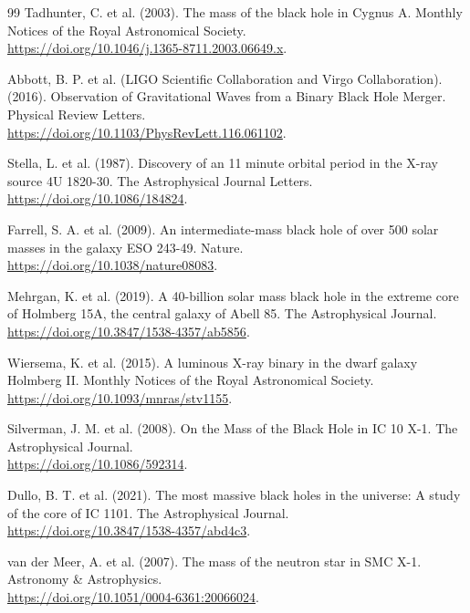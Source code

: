 \documentclass[11pt, a4paper]{article}
\begin{document}
\begin{thebibliography}{99}
  Tadhunter, C. et al. (2003). The mass of the black hole in Cygnus A. Monthly Notices of the Royal Astronomical Society. \\ \url{https://doi.org/10.1046/j.1365-8711.2003.06649.x}.

  Abbott, B. P. et al. (LIGO Scientific Collaboration and Virgo Collaboration). (2016). Observation of Gravitational Waves from a Binary Black Hole Merger. Physical Review Letters. \\ \url{https://doi.org/10.1103/PhysRevLett.116.061102}.

  Stella, L. et al. (1987). Discovery of an 11 minute orbital period in the X-ray source 4U 1820-30. The Astrophysical Journal Letters. \\ \url{https://doi.org/10.1086/184824}.

  Farrell, S. A. et al. (2009). An intermediate-mass black hole of over 500 solar masses in the galaxy ESO 243-49. Nature. \\ \url{https://doi.org/10.1038/nature08083}.

  Mehrgan, K. et al. (2019). A 40-billion solar mass black hole in the extreme core of Holmberg 15A, the central galaxy of Abell 85. The Astrophysical Journal. \\ \url{https://doi.org/10.3847/1538-4357/ab5856}.

  Wiersema, K. et al. (2015). A luminous X-ray binary in the dwarf galaxy Holmberg II. Monthly Notices of the Royal Astronomical Society. \\ \url{https://doi.org/10.1093/mnras/stv1155}.

  Silverman, J. M. et al. (2008). On the Mass of the Black Hole in IC 10 X-1. The Astrophysical Journal. \\ \url{https://doi.org/10.1086/592314}.

  Dullo, B. T. et al. (2021). The most massive black holes in the universe: A study of the core of IC 1101. The Astrophysical Journal. \\ \url{https://doi.org/10.3847/1538-4357/abd4c3}.

  van der Meer, A. et al. (2007). The mass of the neutron star in SMC X-1. Astronomy \& Astrophysics. \\ \url{https://doi.org/10.1051/0004-6361:20066024}.


\end{thebibliography}
\end{document}
